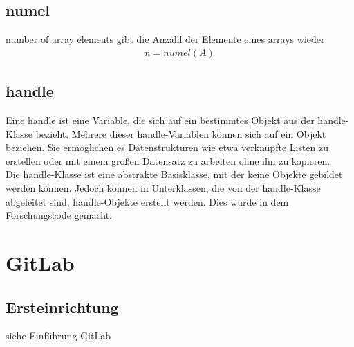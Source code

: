 \documentclass[12pt,bibstyle=none,pagenumberinfooter]{ifmdocument}
\begin{document}
	\subsection{numel}
		\glqq number of array elements\grqq{}
		gibt die Anzahl der Elemente eines \glqq arrays\grqq{} wieder
		\begin{gather*}
			n=numel(A)
		\end{gather*}
	\subsection{handle}
	Eine \glqq handle\grqq{} ist eine Variable, die sich auf ein bestimmtes Objekt aus der handle-Klasse bezieht. Mehrere dieser handle-Variablen k\"onnen sich auf ein Objekt beziehen. Sie erm\"oglichen es Datenstrukturen wie etwa verkn\"upfte Listen zu erstellen oder mit einem großen Datensatz zu arbeiten ohne ihn zu kopieren.\\
	Die handle-Klasse ist eine abstrakte Basisklasse, mit der keine Objekte gebildet werden k\"onnen. Jedoch k\"onnen in Unterklassen, die von der handle-Klasse abgeleitet sind, handle-Objekte erstellt werden. Dies wurde in dem Forschungscode gemacht.
	
	\section{GitLab}
	\subsection{Ersteinrichtung}
	siehe Einf\"uhrung GitLab
\end{document}

